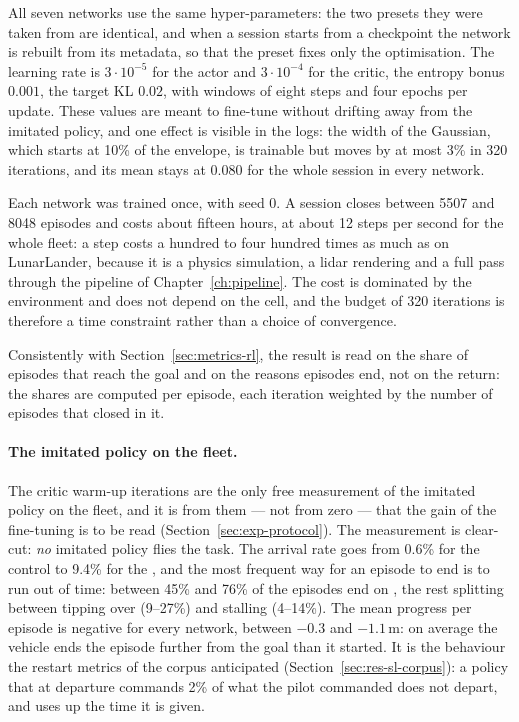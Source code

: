 All seven networks use the same hyper-parameters: the two presets they were
taken from are identical, and when a session starts from a checkpoint the
network is rebuilt from its metadata, so that the preset fixes only the
optimisation. The learning rate is $3\cdot10^{-5}$ for the actor and
$3\cdot10^{-4}$ for the critic, the entropy bonus $0.001$, the target KL
$0.02$, with windows of eight steps and four epochs per update. These values
are meant to fine-tune without drifting away from the imitated policy, and one
effect is visible in the logs: the width of the Gaussian, which starts at 10\%
of the envelope, is trainable but moves by at most 3\% in \num{320}
iterations, and its mean stays at $0.080$ for the whole session in every
network.

Each network was trained once, with seed $0$. A session closes between
\num{5507} and \num{8048} episodes and costs about fifteen hours, at about
\num{12} steps per second for the whole fleet: a step costs a hundred to four
hundred times as much as on LunarLander, because it is a physics simulation, a
lidar rendering and a full pass through the pipeline of
Chapter~\ref{ch:pipeline}. The cost is dominated by the environment and does
not depend on the cell, and the budget of \num{320} iterations is therefore a
time constraint rather than a choice of convergence.

Consistently with Section~\ref{sec:metrics-rl}, the result is read on the share
of episodes that reach the goal and on the reasons episodes end, not on the
return: the shares are computed per episode, each iteration weighted by the
number of episodes that closed in it.

\paragraph{The imitated policy on the fleet.}
The critic warm-up iterations are the only free measurement of the imitated
policy on the fleet, and it is from them --- not from zero --- that the gain of
the fine-tuning is to be read (Section~\ref{sec:exp-protocol}). The measurement
is clear-cut: \emph{no} imitated policy flies the task. The arrival rate goes
from 0.6\% for the control to 9.4\% for the , and the
most frequent way for an episode to end is to run out of time: between 45\%
and 76\% of the episodes end on , the rest splitting between
tipping over (9--27\%) and stalling (4--14\%). The mean progress per episode
is negative for every network, between $-0.3$ and $-1.1$\,m: on average the
vehicle ends the episode further from the goal than it started. It is the
behaviour the restart metrics of the corpus anticipated
(Section~\ref{sec:res-sl-corpus}): a policy that at departure commands 2\% of
what the pilot commanded does not depart, and uses up the time it is given.

